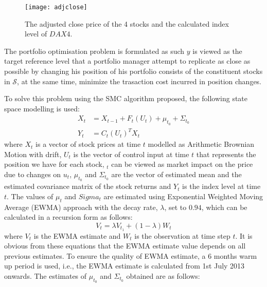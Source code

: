 \begin{figure}[htbp]
\centering
\texttt{[image: adjclose]}
\caption{The adjusted close price of the 4 stocks and the calculated index level of $DAX4$.}
\label{fig:adjclose}
\end{figure}
 
The portfolio optimisation problem is formulated as such $y$ is viewed as the target reference level that a portfolio manager attempt to replicate as close as possible by changing his position of his portfolio consists of the constituent stocks in $\mathcal{S}$, at the same time, minimize the trasaction cost incurred in position changes.
 
To solve this problem using the SMC algorithm proposed,  the following state space modelling is used:
\begin{align}
  X_t &= X_{t-1} + F_t(U_t) + \mu_{t_0} + \Sigma_{t_0} \\
  Y_t &= C_t(U_t)^{T}X_t
\end{align}
where $X_t$ is a vector of stock prices at time $t$ modelled as Arithmetic Brownian Motion with drift, $U_t$ is the vector of control input at time $t$ that represents the position we have for each stock, $_t$ can be viewed as market impact on the price due to changes on $u_t$, $\mu_{t_0}$ and $\Sigma_{t_0}$ are the vector of estimated mean and the estimated covariance matrix of the stock returns and $Y_t$ is the index level at time $t$. The values of $\mu_t$ and $Sigma_t$ are estimated using Exponential Weighted Moving Average (EWMA) approach with the decay rate, $\lambda$, set to $0.94$, which can be calculated in a recursion form as follows:
\begin{equation}
  V_t = \lambda V_{t_1} + (1-\lambda) W_{t}
\end{equation}
where $V_t$ is the EWMA estimate and $W_t$ is the observation at time step $t$. It is obvious from these equations that the EWMA estimate value depends on all previous estimates. To ensure the quality of EWMA estimate, a 6 months warm up period is used, i.e., the EWMA estimate is calculated from 1st July 2013 onwards. The estimates of $\mu_{t_0}$ and $\Sigma_{t_0}$ obtained are as follows:
